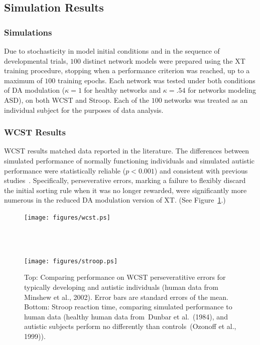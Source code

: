 \subsection{Simulation Results}

\subsubsection{Simulations} 
Due to stochasticity in model initial conditions and in the sequence of developmental trials, $100$ distinct network models were prepared using the XT training procedure, stopping when a performance criterion was reached, up to a maximum of $100$ training epochs.  Each network was tested under both conditions of DA modulation ($\kappa = 1$ for healthy networks and $\kappa = .54$ for networks modeling ASD), on both WCST and Stroop. Each of the $100$ networks was treated as an individual subject for the purposes of data analysis.

\subsubsection{WCST Results} 
WCST results matched data reported in the literature. The differences between simulated performance of normally functioning individuals and simulated autistic performance were statistically reliable ($p < 0.001$) and consistent with previous studies~\cite{PriorMR:1990:AutismWCST,Ozonoff:1999:AutismStroopWCST,MinshewNJ:2002:AutismWCST}. Specifically, perseverative errors, marking a failure to flexibly discard the initial sorting rule when it was no longer rewarded, were significantly more numerous in the reduced DA modulation version of XT. (See Figure~\ref{ed-results-figure}.)

\begin{figure}
\begin{center}
	\texttt{[image: figures/wcst.ps]}
                                                                
\textcolor{white}{\\--------------------------------\\}

	\texttt{[image: figures/stroop.ps]}
\end{center}
\caption{Top: Comparing performance on WCST perseveratitive errors for typically developing and autistic individuals (human data from Minshew et al., 2002). Error bars are standard errors of the mean. Bottom: Stroop reaction time, comparing simulated performance to human data (healthy human data from~Dunbar et al.~(1984), and autistic subjects perform no differently than controls~(Ozonoff et al., 1999)).} 
\label{ed-results-figure}
\end{figure} 

